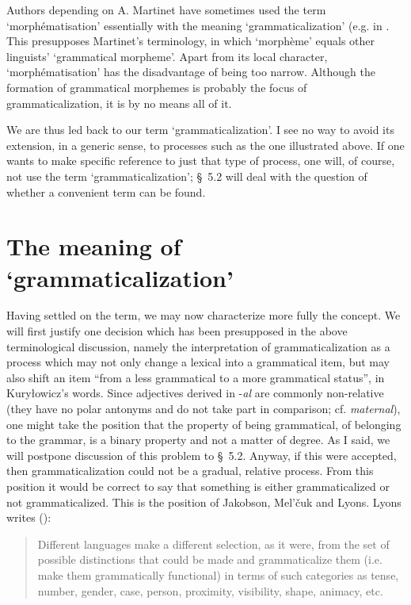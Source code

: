 Authors depending on A. Martinet have sometimes used the term ‘morphématisation’ essentially with the meaning ‘grammaticalization’ (e.g. in \citep[1064f]{Martinet1968}. This presupposes Martinet's terminology, in which ‘morphème’ equals other linguists' ‘grammatical morpheme’. Apart from its local character, ‘morphématisation’ has the disadvantage of being too narrow. Although the formation of grammatical morphemes is probably the focus of grammaticalization, it is by no means all of it.

We are thus led back to our term ‘grammaticalization’. I see no way to avoid its extension, in a generic sense, to processes such as the one illustrated above. If one wants to make specific reference to just that type of process, one will, of course, not use the term ‘grammaticalization’; §~5.2 will deal with the question of whether a convenient term can be found.

\section{The meaning of ‘grammaticalization’} \label{sec:2.2}

Having settled on the term, we may now characterize more fully the concept. We will first justify one decision which has been presupposed in the above terminological discussion, namely the interpretation of grammaticalization as a process which may not only change a lexical into a grammatical item, but may also shift an item “from a less grammatical to a more grammatical status”, in Kuryłowicz's words. Since adjectives derived in -\textit{al} are commonly non-relative (they have no polar antonyms and do not take part in comparison; cf. \textit{maternal}), one might take the position that the property of being grammatical, of belonging to the grammar, is a binary property and not a matter of degree. As I said, we will postpone discussion of this problem to §~5.2. Anyway, if this were accepted, then grammaticalization could not be a gradual, relative process. From this position it would be correct to say that something is either grammaticalized or not grammaticalized. This is the position of Jakobson, Mel'čuk and Lyons. Lyons writes (\citeyear[234]{Lyons1977}):

\begin{quote}
Different languages make a different selection, as it were, from the set of possible distinctions that could be made and grammaticalize them (i.e. make them grammatically functional) in terms of such categories as tense, number, gender, case, person, proximity, visibility, shape, animacy, etc.
\end{quote}

